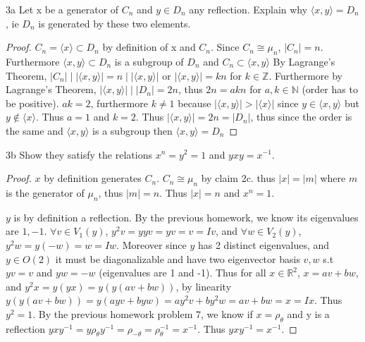 \documentclass{article}
\newcommand{\R}{\mathbb{R}}
\newcommand{\Z}{\mathbb{Z}}
\newcommand{\N}{\mathbb{N}}
\newcommand{\abs}[1]{\lvert #1\rvert}
\newcommand{\angles}[1]{\langle{#1}\rangle}
\begin{document}
\bigskip

\begin{claim}{3a}
    Let x be a generator of $C_n$ and $y \in D_n$ any reflection. Explain why $\angles{x,y} = D_n$, ie $D_n$ is generated by these two elements.
\end{claim}
\begin{proof}
    $C_n = \angles{x} \subset D_n$ by definition of x and $C_n$. Since $C_n \cong \mu_n$, $\abs{C_n} = n$. Furthermore $\angles{x, y} \subset D_n$ is a subgroup of $D_n$ and $C_n \subset \angles{x, y}$ By Lagrange's Theorem, $\abs{C_n} \mid \abs{\angles{x, y}} = n \mid \abs{\angles{x, y}}$ or $\abs{\angles{x, y}} = kn$ for $k \in \Z$. Furthermore by Lagrange's Theorem, $\abs{\angles{x, y}} \mid \abs{D_n} = 2n$, thus $2n = akn$ for $a, k \in \N$ (order has to be positive). $ak = 2$, furthermore $k \neq 1$ because $\abs{\angles{x, y}} > \abs{\angles{x}}$ since $y \in \angles{x, y}$ but $y \not \in \angles{x}$. Thus $a = 1$ and $k = 2$. Thus $\abs{\angles{x, y}} = 2n = \abs{D_n}$, thus since the order is the same and $\angles{x, y}$ is a subgroup then $\angles{x, y} = D_n$
\end{proof}

\begin{claim}{3b}
    Show they satisfy the relations $x^n = y^2 =1$ and $yxy = x^{-1}$.  
\end{claim}
\begin{proof}
    $x$ by definition generates $C_n$. $C_n \cong \mu_n$ by claim 2c. thus $\abs{x}  =\abs{m}$ where $m$ is the generator of $\mu_n$, thus $\abs{m} = n$. Thus $\abs{x} = n$ and $x^n = 1$. 

    $y$ is by definition a reflection. By the previous homework, we know its eigenvalues are $1, -1$. $\forall v \in V_1(y)$, $y^2v = yyv = yv = v = Iv$, and $\forall w \in V_2(y)$, $y^2w = y(-w) = w = Iw$. Moreover since $y$ has 2 distinct eigenvalues, and $y \in O(2)$ it must be diagonalizable and have two eigenvector basis $v, w$ s.t $yv = v$ and $yw = -w$ (eigenvalues are 1 and -1). Thus for all $x \in \R^2$, $x = av + bw$, and $y^2x = y(yx) = y(y(av + bw))$, by linearity $y(y(av + bw)) = y(ayv + byw) = ay^2v + by^2w = av + bw = x = Ix$. Thus $y^2 = 1$. By the previous homework problem 7, we know if $x = \rho_{\theta}$ and y is a reflection $yxy^{-1} = y\rho_\theta y^{-1} = \rho_{-\theta} = \rho_{\theta}^{-1} = x^{-1}$. Thus $yxy^{-1} = x^{-1}$.
\end{proof}
\end{document}
